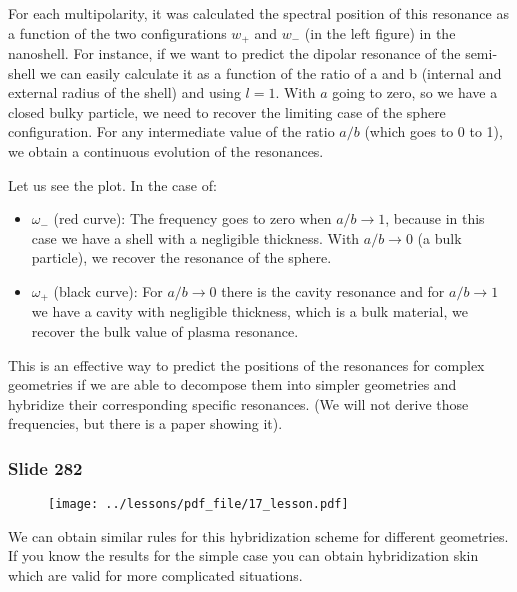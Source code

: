 \documentclass[../main/main.tex]{subfiles}
\begin{document}
For each multipolarity, it was calculated the spectral position of this resonance as a function of the two configurations $w_{+}$ and $w_{-}$ (in the left figure) in the nanoshell.
For instance, if we want to predict the dipolar resonance of the semi-shell we can easily calculate it as a function of the ratio of a and b (internal and external radius of the shell) and using $l=1$.
With $a$ going to zero, so we have a closed bulky particle, we need to recover the limiting case of the sphere configuration.
For any intermediate value of the ratio $a/b$ (which goes to 0 to 1), we obtain a continuous evolution of the resonances.

Let us see the plot. In the case of:
\begin{itemize}
    \item{ $\omega_{-}$ (red curve):}
    The frequency goes to zero when $a/b \to 1$, because in this case we have a shell with a negligible thickness.
    With $a/b \to 0$ (a bulk particle), we recover the resonance of the sphere.

    \item{ $\omega_{+}$ (black curve):}
    For $a/b \to 0$ there is the cavity resonance and for $a/b \to 1$ we have a cavity with negligible thickness, which is a bulk material, we recover the bulk value of plasma resonance.

\end{itemize}

This is an effective way to predict the positions of the resonances for complex geometries if we are able to decompose them into simpler geometries and hybridize their corresponding specific resonances. (We will not derive those frequencies, but there is a paper showing it).



\newpage

\subsubsection{Slide 282}

\begin{figure}[h!]
\centering
\texttt{[image: ../lessons/pdf\_file/17\_lesson.pdf]}
\end{figure}

We can obtain similar rules for this hybridization scheme for different geometries. If you know the results for the simple case you can obtain hybridization skin which are valid for more complicated situations.
\end{document}
